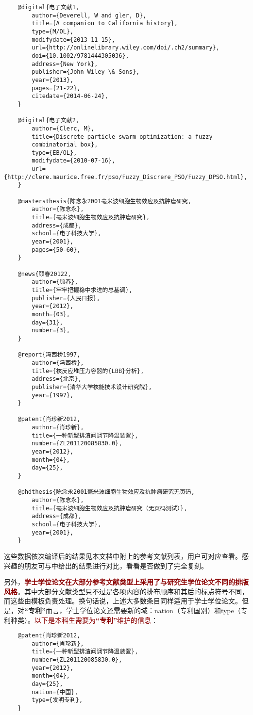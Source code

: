 \documentclass[print, doctor, vlined]{DissertUESTC}
\begin{document}
\begin{verbatim}
	@digital{电子文献1,
	    author={Deverell, W and gler, D},
	    title={A companion to California history},
	    type={M/OL},
	    modifydate={2013-11-15},
	    url={http://onlinelibrary.wiley.com/doi/.ch2/summary},
	    doi={10.1002/9781444305036},
	    address={New York},
	    publisher={John Wiley \& Sons},
	    year={2013},
	    pages={21-22},
	    citedate={2014-06-24},
	}
	
	@digital{电子文献2,
	    author={Clerc, M},
	    title={Discrete particle swarm optimization: a fuzzy
	    combinatorial box},
	    type={EB/OL},
	    modifydate={2010-07-16},
	    url={http://clere.maurice.free.fr/pso/Fuzzy_Discrere_PSO/Fuzzy_DPSO.html},
	}
	
	@mastersthesis{陈念永2001毫米波细胞生物效应及抗肿瘤研究,
	    author={陈念永},
	    title={毫米波细胞生物效应及抗肿瘤研究},
	    address={成都},
	    school={电子科技大学},
	    year={2001},
	    pages={50-60},
	}
	
	@news{顾春20122,
	    author={顾春},
	    title={牢牢把握稳中求进的总基调},
	    publisher={人民日报},
	    year={2012},
	    month={03},
	    day={31},
	    number={3},
	}
	
	@report{冯西桥1997,
	    author={冯西桥},
	    title={核反应堆压力容器的{LBB}分析},
	    address={北京},
	    publisher={清华大学核能技术设计研究院},
	    year={1997},
	}
	
	@patent{肖珍新2012,
	    author={肖珍新},
	    title={一种新型排渣阀调节降温装置},
	    number={ZL201120085830.0},
	    year={2012},
	    month={04},
	    day={25},
	}

	@phdthesis{陈念永2001毫米波细胞生物效应及抗肿瘤研究无页码,
	    author={陈念永},
	    title={毫米波细胞生物效应及抗肿瘤研究（无页码测试）},
	    address={成都},
	    school={电子科技大学},
	    year={2001},
	}
	\end{verbatim}
	
	这些数据依次编译后的结果见本文档中附上的参考文献列表，用户可对应查看。感兴趣的朋友可与\href{https://gr.uestc.edu.cn/xiazai/114/3917}{}中给出的结果进行对比，看看是否做到了完全复刻。

	另外，\textbf{\textcolor{DarkRed}{学士学位论文在大部分参考文献类型上采用了与研究生学位论文不同的排版风格}}。其中大部分文献类型只不过是各项内容的排布顺序和其后的标点符号不同，而这些由模板负责处理。换句话说，上述大多数条目同样适用于学士学位论文。但是，对\textbf{“专利”}而言，学士学位论文还需要新的域：nation（专利国别）和type（专利种类）。\textcolor{DarkRed}{以下是本科生需要为\textbf{“专利”}维护的信息}：
	\begin{verbatim}
	@patent{肖珍新2012,
	    author={肖珍新},
	    title={一种新型排渣阀调节降温装置},
	    number={ZL201120085830.0},
	    year={2012},
	    month={04},
	    day={25},
	    nation={中国},
	    type={发明专利},
	}
	\end{verbatim}
\end{document}
